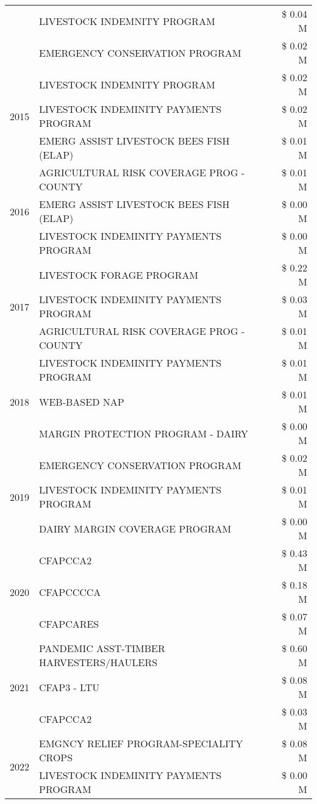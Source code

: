 \begin{tabular}{llr}
 & LIVESTOCK INDEMNITY PROGRAM & \$ 0.04 M \\
 & EMERGENCY CONSERVATION PROGRAM & \$ 0.02 M \\
\cline{1-3}
\multirow[t]{3}{*}{2015} & LIVESTOCK INDEMNITY PROGRAM & \$ 0.02 M \\
 & LIVESTOCK INDEMINITY PAYMENTS PROGRAM & \$ 0.02 M \\
 & EMERG ASSIST LIVESTOCK BEES FISH (ELAP) & \$ 0.01 M \\
\cline{1-3}
\multirow[t]{3}{*}{2016} & AGRICULTURAL RISK COVERAGE PROG - COUNTY & \$ 0.01 M \\
 & EMERG ASSIST LIVESTOCK BEES FISH (ELAP) & \$ 0.00 M \\
 & LIVESTOCK INDEMINITY PAYMENTS PROGRAM & \$ 0.00 M \\
\cline{1-3}
\multirow[t]{3}{*}{2017} & LIVESTOCK FORAGE PROGRAM & \$ 0.22 M \\
 & LIVESTOCK INDEMINITY PAYMENTS PROGRAM & \$ 0.03 M \\
 & AGRICULTURAL RISK COVERAGE PROG - COUNTY & \$ 0.01 M \\
\cline{1-3}
\multirow[t]{3}{*}{2018} & LIVESTOCK INDEMINITY PAYMENTS PROGRAM & \$ 0.01 M \\
 & WEB-BASED NAP & \$ 0.01 M \\
 & MARGIN PROTECTION PROGRAM - DAIRY & \$ 0.00 M \\
\cline{1-3}
\multirow[t]{3}{*}{2019} & EMERGENCY CONSERVATION PROGRAM & \$ 0.02 M \\
 & LIVESTOCK INDEMINITY PAYMENTS PROGRAM & \$ 0.01 M \\
 & DAIRY MARGIN COVERAGE PROGRAM & \$ 0.00 M \\
\cline{1-3}
\multirow[t]{3}{*}{2020} & CFAPCCA2 & \$ 0.43 M \\
 & CFAPCCCCA & \$ 0.18 M \\
 & CFAPCARES & \$ 0.07 M \\
\cline{1-3}
\multirow[t]{3}{*}{2021} & PANDEMIC ASST-TIMBER HARVESTERS/HAULERS & \$ 0.60 M \\
 & CFAP3 - LTU & \$ 0.08 M \\
 & CFAPCCA2 & \$ 0.03 M \\
\cline{1-3}
\multirow[t]{2}{*}{2022} & EMGNCY RELIEF PROGRAM-SPECIALITY CROPS & \$ 0.08 M \\
 & LIVESTOCK INDEMINITY PAYMENTS PROGRAM & \$ 0.00 M \\
\cline{1-3}
\bottomrule
\end{tabular}
